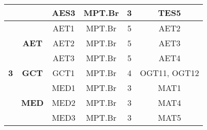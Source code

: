 \begin{table}[H]
{\begin{tabular}{|c|c|c|c|c|c|}
                                                                                &                               & AES3        & MPT.Br            & 3                                                                                  & TES5                                                                      \\ \hline
\multirow{7}{*}{\textbf{3}}                                                     & \multirow{3}{*}{\textbf{AET}} & AET1        & MPT.Br            & 5                                                                                  & AET2                                                                      \\ \cline{3-6} 
                                                                                &                               & AET2        & MPT.Br            & 5                                                                                  & AET3                                                                      \\ \cline{3-6} 
                                                                                &                               & AET3        & MPT.Br            & 5                                                                                  & AET4                                                                      \\ \cline{2-6} 
                                                                                & \textbf{GCT}                  & GCT1        & MPT.Br            & 4                                                                                  & OGT11, OGT12                                                              \\ \cline{2-6} 
                                                                                & \multirow{3}{*}{\textbf{MED}} & MED1        & MPT.Br            & 3                                                                                  & MAT1                                                                      \\ \cline{3-6} 
                                                                                &                               & MED2        & MPT.Br            & 3                                                                                  & MAT4                                                                      \\ \cline{3-6} 
                                                                                &                               & MED3        & MPT.Br            & 3                                                                                  & MAT5                                                                      \\ \hline

\end{tabular}}
\end{table}
